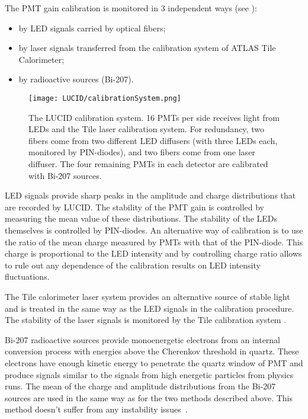 The PMT gain calibration is monitored in 3 independent ways (see ):
\begin{itemize}
 \item by LED signals carried by optical fibers;
 \item by laser signals transferred from the calibration system of ATLAS Tile Calorimeter;
 \item by radioactive sources (Bi-207).
\end{itemize}

\begin{figure}
\centering
\texttt{[image: LUCID/calibrationSystem.png]}
\caption{The LUCID calibration system. 16 PMTs per side receives light from LEDs and the Tile laser calibration 
system. 
For redundancy, two fibers come from two different LED diffusers (with three LEDs each, monitored by 
PIN-diodes), and two fibers come from one laser diffuser. The four remaining PMTs in each detector are calibrated 
with Bi-207 sources.}
\label{fig:calibrationSystem}
\end{figure}

LED signals provide sharp peaks in the amplitude and charge distributions that are recorded by LUCID.
The stability of the PMT gain is controlled by measuring the mean value of these distributions. 
The stability of the LEDs themselves is controlled by PIN-diodes.
An alternative way of calibration is to use the ratio of the mean charge measured by PMTs with that of the 
PIN-diode. 
This charge is proportional to the LED intensity and by controlling charge ratio allows to rule out any 
dependence of the calibration results on LED intensity fluctuations.

The Tile calorimeter laser system provides an alternative source of stable light and is treated in the same way
as the LED signals in the calibration procedure. 
The stability of the laser signals is monitored by the Tile calibration system \cite{atlasGeneral}.

Bi-207 radioactive sources provide monoenergetic electrons from an internal conversion process with energies 
above the Cherenkov threshold in quartz. These electrons
have enough kinetic energy to penetrate the quartz window of PMT and produce signals similar to the signals 
from high 
energetic particles from physics runs. The mean of the charge and amplitude 
distributions from the Bi-207 sources are used in the same way as for the two methods described above. 
This method doesn't suffer from any instability issues~\cite{Alberghi:2016tad}.

